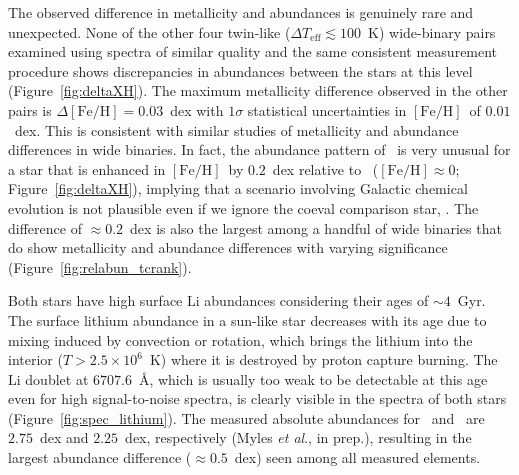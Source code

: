 \documentclass[12pt,letterpaper,margin=1in]{article}
\newcommand{\figname}{Figure}
\newcommand{\etal}{\textit{et al}.}
\newcommand*\elem[1]{\ensuremath{\mathrm{#1}}}
\newcommand*\elemH[1]{\ensuremath{[\mathrm{#1}/\elem{H}]}}
\newcommand*{\feh}{\ensuremath{\elemH{Fe}}}
\newcommand{\sunanalog}{\text{Krios}}
\newcommand{\bizarreone}{\text{Kronos}}
\begin{document}
The observed difference in metallicity and abundances is genuinely rare and
unexpected.
None of the other four twin-like ($\Delta T_\mathrm{eff} \lesssim 100$~K)
wide-binary pairs examined using spectra of similar quality and the same
consistent measurement procedure shows discrepancies in abundances between the
stars at this level\cite{2016ApJS..225...32B} (\figname~\ref{fig:deltaXH}).
The maximum metallicity difference observed in the other pairs is $\Delta\feh =
0.03$~dex with $1\sigma$ statistical uncertainties in \feh\ of $0.01$~dex.
This is consistent with similar studies of metallicity and abundance
differences in wide binaries\cite{Gratton:2001aa,Desidera:2004aa}.
In fact, the abundance pattern of \bizarreone\ is very unusual
for a star that is enhanced in \feh\ by $0.2$~dex relative to \sunanalog\
($\feh\approx 0$; \figname~\ref{fig:deltaXH}),
implying that a scenario involving Galactic chemical evolution is not plausible
even if we ignore the coeval comparison star, \sunanalog.
The difference of $\approx 0.2$~dex is also the largest among a handful of wide
binaries that do show metallicity and abundance differences with varying
significance\cite{Mack:2014aa,Mack:2016aa,Saffe:2015aa,
  Teske:2013aa,Teske:2015aa,Teske:2016aa,Teske:2016ab,Biazzo:2015aa,Ramirez:2015aa}
(\figname~\ref{fig:relabun_tcrank}).

Both stars have high surface \elem{Li} abundances considering
their ages of $\sim 4$~Gyr.
The surface lithium abundance in a sun-like star decreases with its age due to
mixing induced by convection or rotation, which brings the lithium into the
interior ($T>2.5 \times 10^{6}$~K) where it is destroyed by proton capture
burning. %
The \elem{Li} doublet at $6707.6$~\AA, which is usually too weak to be
detectable at this age even for high signal-to-noise spectra, is clearly
visible in the spectra of both stars (\figname~\ref{fig:spec_lithium}).
The measured absolute abundances for \bizarreone\ and \sunanalog\ are
$2.75$~dex and $2.25$~dex, respectively (Myles \etal, in prep.),
resulting in the largest abundance difference ($\approx 0.5$~dex) seen
among all measured elements.
\end{document}
